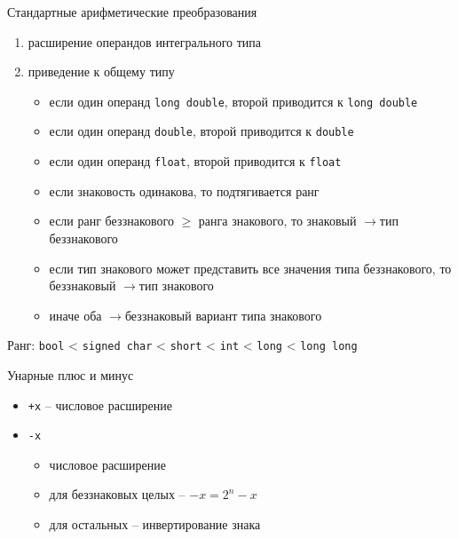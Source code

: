 \documentclass[unknownkeysallowed,xcolor=table]{beamer}
\newcommand{\rarr}{$\rightarrow$}
\begin{document}
\begin{frame}[fragile]{Стандартные арифметические преобразования}
  \begin{enumerate}
    \item расширение операндов интегрального типа \vspace{0.5em}
    \item приведение к общему типу
      \begin{itemize}
        \item если один операнд \lstinline{long double}, второй приводится к \lstinline{long double}
        \item если один операнд \lstinline{double}, второй приводится к \lstinline{double}
        \item если один операнд \lstinline{float}, второй приводится к \lstinline{float}
        \item если знаковость одинакова, то подтягивается ранг
        \item если ранг беззнакового $\geq$ ранга знакового, то знаковый \rarr тип беззнакового
        \item если тип знакового может представить все значения типа беззнакового, то беззнаковый \rarr тип знакового
        \item иначе оба \rarr беззнаковый вариант типа знакового
      \end{itemize}
  \end{enumerate}

  \vspace{0.5em}

  Ранг: \lstinline{bool} < \lstinline{signed char} < \lstinline{short} < \lstinline{int} < \lstinline{long} < \lstinline{long long}
\end{frame}

\begin{frame}[fragile]{Унарные плюс и минус}
  \begin{itemize}
    \item \lstinline{+x} -- числовое расширение \vspace{2em}
    \item \lstinline{-x}
      \begin{itemize}
        \item числовое расширение \vspace{1em}
        \item для беззнаковых целых -- $-x = 2^n-x$ \vspace{1em}
        \item для остальных -- инвертирование знака
      \end{itemize}
  \end{itemize}
\end{frame}
\end{document}
